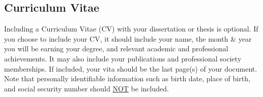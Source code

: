 \subsection{Curriculum Vitae}

Including a Curriculum Vitae (CV) with your dissertation or thesis is optional.
If you choose to include your CV, it should include your name, the month \& year you will be earning your degree, and relevant academic and professional achievements.
It may also include your publications and professional society memberships.
If included, your vita should be the last page(s) of your document.
Note that personally identifiable information such as birth date, place of birth, and social security number should \underline{NOT} be included.
